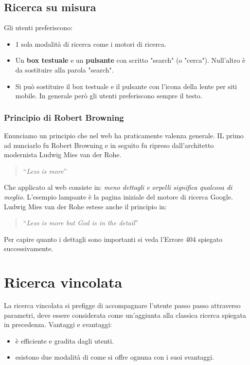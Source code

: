 		\subsection{Ricerca su misura}	
			Gli utenti preferiscono:
			\begin{itemize}
				\item 1 sola modalità di ricerca come i motori di ricerca.
				\item Un \textbf{box testuale} e un \textbf{pulsante} con scritto "search" (o "cerca"). Null'altro è da sostituire alla parola "search".
				\item Si può sostituire il box testuale e il pulsante con l'icona della lente per siti mobile. In generale però gli utenti preferiscono sempre il testo.
			\end{itemize}
	
			\subsubsection{Principio di Robert Browning}
				Enunciamo un principio che nel web ha praticamente valenza generale. IL primo ad nunciarlo fu Robert Browning e in seguito fu ripreso dall'architetto modernista Ludwig Mies van der Rohe.
				\begin{quote}
					``\emph{Less is more}''
				\end{quote}
				Che applicato al web consiste in: \emph{meno dettagli e orpelli significa qualcosa di meglio}. L'esempio lampante è la pagina iniziale del motore di ricerca Google.
				Ludwig Mies van der Rohe estese anche il principio in:
				\begin{quote}
					``\emph{Less is more but God is in the detail}''
				\end{quote} 
				Per capire quanto i dettagli sono importanti si veda l'Errore 404 spiegato successivamente.
	
	\section{Ricerca vincolata}
		La ricerca vincolata si prefigge di accompagnare l'utente passo passo attraverso parametri, deve essere considerata come un'aggiunta alla classica ricerca spiegata in precedenza. Vantaggi e svantaggi:
		\begin{itemize}
			\item è efficiente e gradita dagli utenti.
			\item esistono due modalità di come si offre ognuna con i suoi svantaggi.
		\end{itemize}
		
